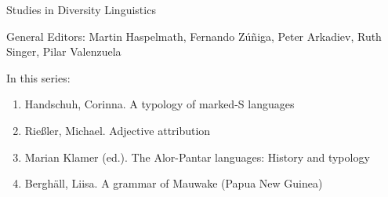 
{\large Studies in Diversity Linguistics}

\bigskip

General Editors: Martin Haspelmath, Fernando Zúñiga, Peter Arkadiev, Ruth Singer, Pilar Valen­zuela

\bigskip

In this series:

\begin{enumerate}
\item Handschuh, Corinna. A typology of marked-S languages
\item Rießler, Michael. Adjective attribution
\item Marian Klamer (ed.). The Alor-Pantar languages: History and typology
\item Berghäll, Liisa. A grammar of Mauwake (Papua New Guinea)
\end{enumerate}


